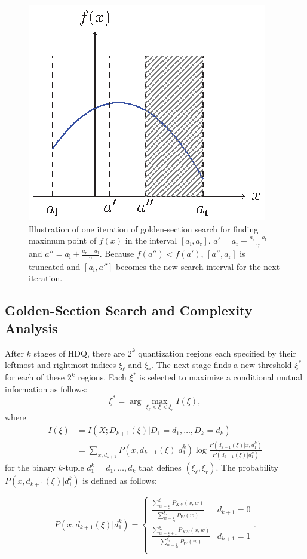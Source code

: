 \documentclass [PhD] {uclathes}
\begin{document}
\begin{figure}[t]
	\centering
	\includegraphics[width=0.5\linewidth]{figures/gss.eps}
	\caption{ Illustration of one iteration of golden-section search for finding maximum point of $f(x)$ in the interval $[a_\text{l},a_\text{r}]$. $a'=a_{\text{r}}-\frac{a_\text{r}-a_\text{l}}{\gamma}$ and $a''=a_{\text{l}}+\frac{a_\text{r}-a_\text{l}}{\gamma}$. Because $f(a'')<f(a')$, $[a'',a_\text{r}]$ is truncated and $[a_\text{l},a'']$ becomes the new search interval for the next iteration. 
	}
	\label{fig: gss}
\end{figure}

\subsection{Golden-Section Search and Complexity Analysis}\label{Sec: GSS}
After $k$ stages of HDQ, there are $2^k$ quantization regions each specified by their leftmost and rightmost indices $\xi_{\ell}$ and $\xi_r$.  The next stage finds a new threshold $\xi^*$ for each of these $2^k$ regions.   Each $\xi^*$ is selected to maximize a conditional mutual information as follows:
    \begin{equation}
    \xi^* = \arg \max_{\xi_{\ell}<\xi<\xi_r}  I(\xi),
    \label{equ: optimzation}
    \end{equation}
where 
\begin{align}
      I(\xi) &= I\left(X;D_{k+1}(\xi)|D_1=d_1, \ldots,D_k=d_k \right)\label{equ: I_xi} \\
    &= \sum_{x,d_{k+1}} P\left(x,d_{k+1}(\xi)|d_1^k\right) \log  \frac{P(d_{k+1}(\xi)|x,d_1^k) }{P(d_{k+1}(\xi)|d_1^k) }
\end{align}
for the binary $k$-tuple $d_1^k=d_1, \ldots, d_k$  that defines $(\xi_{\ell}, \xi_r)$. The probability $P\left(x,d_{k+1}(\xi)|d_1^k\right)$ is defined as follows:

\begin{equation}
    P\left(x,d_{k+1}(\xi)|d_1^k\right) = 
    \begin{cases}
    \frac{\sum_{w=\xi_l}^{\xi} P_{XW}(x,w)}{\sum_{w=\xi_l}^{\xi_r} P_{W}(w)} & d_{k+1}=0\\
    \frac{\sum_{w=\xi+1}^{\xi_r} P_{XW}(x,w)}{\sum_{w=\xi_l}^{\xi_r} P_{W}(w)} & d_{k+1}=1\\
    \end{cases}.
\end{equation}
\end{document}
